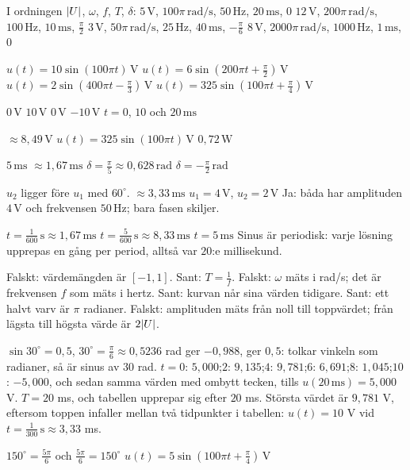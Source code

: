 \begin{facit}
 I ordningen $\lvert U\rvert$, $\omega$, $f$, $T$, $\delta$:
 $5\,\text{V}$, $100\pi\,\text{rad/s}$, $50\,\text{Hz}$, $20\,\text{ms}$, $0$
 $12\,\text{V}$, $200\pi\,\text{rad/s}$, $100\,\text{Hz}$, $10\,\text{ms}$, $\frac{\pi}{2}$
 $3\,\text{V}$, $50\pi\,\text{rad/s}$, $25\,\text{Hz}$, $40\,\text{ms}$, $-\frac{\pi}{6}$
 $8\,\text{V}$, $2000\pi\,\text{rad/s}$, $1000\,\text{Hz}$, $1\,\text{ms}$, $0$

  $u(t) = 10\sin(100\pi t)\,\text{V}$
 $u(t) = 6\sin(200\pi t + \frac{\pi}{2})\,\text{V}$
 $u(t) = 2\sin(400\pi t - \frac{\pi}{3})\,\text{V}$
 $u(t) = 325\sin(100\pi t + \frac{\pi}{4})\,\text{V}$

  $0\,\text{V}$  $10\,\text{V}$  $0\,\text{V}$  $-10\,\text{V}$
 $t = 0$, $10$ och $20\,\text{ms}$

  $\approx 8{,}49\,\text{V}$  $u(t) = 325\sin(100\pi t)\,\text{V}$
 $0{,}72\,\text{W}$

  $5\,\text{ms}$  $\approx 1{,}67\,\text{ms}$
 $\delta = \frac{\pi}{5} \approx 0{,}628\,\text{rad}$
 $\delta = -\frac{\pi}{2}\,\text{rad}$

  $u_2$ ligger före $u_1$ med $60^{\circ}$.  $\approx 3{,}33\,\text{ms}$
 $u_1 = 4\,\text{V}$, $u_2 = 2\,\text{V}$
 Ja: båda har amplituden $4\,\text{V}$ och frekvensen $50\,\text{Hz}$; bara fasen skiljer.

  $t = \frac{1}{600}\,\text{s} \approx 1{,}67\,\text{ms}$
 $t = \frac{5}{600}\,\text{s} \approx 8{,}33\,\text{ms}$  $t = 5\,\text{ms}$
 Sinus är periodisk: varje lösning upprepas en gång per period, alltså var
$20$:e millisekund.

  Falskt: värdemängden är $[-1, 1]$.
 Sant: $T = \frac{1}{f}$.
 Falskt: $\omega$ mäts i rad/s; det är frekvensen $f$ som mäts i hertz.
 Sant: kurvan når sina värden tidigare.
 Sant: ett halvt varv är $\pi$ radianer.
 Falskt: amplituden mäts från noll till toppvärdet; från lägsta till högsta värde är
$2\lvert U\rvert$.

  $\sin 30^{\circ} = 0{,}5$, $30^{\circ} = \frac{\pi}{6} \approx 0{,}5236$ rad
  ger $-0{,}988$,  ger $0{,}5$: 
tolkar vinkeln som radianer, så  är sinus av $30$ rad.
 $t = 0$: $5{,}000$;\enspace $2$: $9{,}135$;\enspace $4$: $9{,}781$;\enspace $6$:
$6{,}691$;\enspace $8$: $1{,}045$;\enspace $10$: $-5{,}000$, och sedan samma värden med ombytt
tecken, tills $u(20\,\text{ms}) = 5{,}000$ V.
 $T = 20$ ms, och tabellen upprepar sig efter $20$ ms. Största värdet är $9{,}781$ V,
eftersom toppen infaller mellan två tidpunkter i tabellen: $u(t) = 10$ V vid
$t = \frac{1}{300}\,\text{s} \approx 3{,}33$ ms.

  $150^{\circ} = \frac{5\pi}{6}$ och $\frac{5\pi}{6} = 150^{\circ}$
 $u(t) = 5\sin(100\pi t + \frac{\pi}{4})\,\text{V}$

\end{facit}

